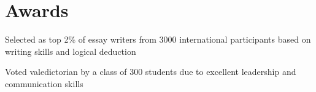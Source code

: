 \documentclass[12pt]{deedy-resume-openfont}
\begin{document}
\begin{minipage}[t]{0.32\textwidth}

\section{Awards} 
\vspace{1mm}

\vspace{1mm} %
\begin{tightemize}
\item Selected as top 2\% of essay writers from 3000 international participants based on writing skills and logical deduction
\end{tightemize}
\vspace{1mm}
\begin{tightemize}
 \item Voted valedictorian by a class of 300 students due to excellent leadership and communication skills

\end{tightemize}
\end{minipage} 


\hfill
\end{document}
